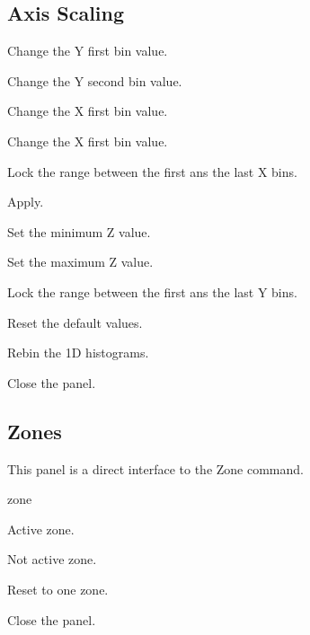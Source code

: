 \newpage

\subsection{Axis Scaling}


\begin{minipage}[t]{.43\textwidth}
\begin{EnumZW}
\item Change the Y first bin value.
\item Change the Y second bin value.
\item Change the X first bin value.
\item Change the X first bin value.
\item Lock the range between the first ans the last X bins.
\end{EnumZW}
\end{minipage}\hfill
\begin{minipage}[t]{.53\textwidth}
\begin{EnumZB}
\item Apply.
\item Set the minimum Z value.
\item Set the maximum Z value.
\item Lock the range between the first ans the last Y bins.
\item Reset the default values.
\item Rebin the 1D histograms.
\item Close the panel.
\end{EnumZB}
\end{minipage}

\subsection{Zones}
 This panel is a direct interface to the Zone command.

\begin{PAWf}[.2]{zone}
\begin{EnumZW}
\item Active zone.
\item Not active zone.
\end{EnumZW}
\begin{EnumZB}
\item Reset to one zone.
\item Close the panel.
\end{EnumZB}
\end{PAWf}

